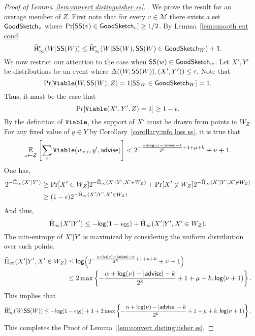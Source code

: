 \begin{proof}[Proof of Lemma~\ref{lem:convert distinguisher ss}].
We prove the result for an average member of $Z$.  First note that for every $v\in \mathcal{M}$ there exists a set $\mathsf{GoodSketch}_v$ where $\Pr[{\mathsf{SS}}(v)\in \mathsf{GoodSketch}_v] \ge 1/2$.  By Lemma~\ref{lem:smooth ent cond}
\[
\tilde{\mathrm{H}}_\infty^\epsilon(W| {\mathsf{SS}}(W)) \le \tilde{\mathrm{H}}_\infty^\epsilon(W| {\mathsf{SS}}(W), {\mathsf{SS}}(W)\in \mathsf{GoodSketch}_W) +1.
\]
We now restrict our attention to the case when ${\mathsf{SS}}(w) \in \mathsf{GoodSketch}_w$.   
Let $X', Y'$ be distributions  be an event where $\Delta((W, {\mathsf{SS}}(W)), (X', Y'))\le \epsilon$. Note that 
\[
\Pr[\mathtt{Viable}(W, {\mathsf{SS}}(W), Z) = 1| {\mathsf{SS}}_W \in \mathsf{GoodSketch}_W] = 1.
\]
Thus, it must be the case that 
\[
\Pr[\mathtt{Viable}(X', Y', Z) = 1] \ge 1-\epsilon.
\]
By the definition of $\mathtt{Viable}$, the support of $X'$ must be drawn from points in $W_Z$.  For any fixed value of $y\in Y$ by Corollary~\ref{corollary:info loss ss}, it is true that 
\begin{align*}
\operatorname*{\mathbb{E}}_{z\leftarrow Z} \left[\sum_{i }  \mathtt{Viable}(w_{z,i}, y', {\mathsf{advise}})  \right]< 2^{-\frac{\alpha+\mathsf{log}\!\left(\nu\right)-|{\mathsf{advise}}|-k}{2^k}+1+\mu+k}+\nu+1.
\end{align*}
One has, 
\begin{align*}
2^{-\tilde{\mathrm{H}}_\infty(X'|Y')} &\ge  \Pr[X' \in W_Z] 2^{-\tilde{\mathrm{H}}_\infty(X'|Y', X'\in W_Z) }+ \Pr[X'\not\in W_Z] 2^{-\tilde{\mathrm{H}}_\infty(X'|Y', X'\not\in W_Z)}\\
 &\ge  (1-\epsilon)2^{-\tilde{\mathrm{H}}_\infty(X'|Y', X'\in W_Z) }
\end{align*}
And thus, 
\[
\tilde{\mathrm{H}}_\infty(X'|Y') \le  -\mathsf{log}\!\left(1-\epsilon_{\mathsf{SS}}\right) +\tilde{\mathrm{H}}_\infty(X'|Y', X'\in W_Z).
\]
The min-entropy of $X' |Y'$ is maximized by considering the uniform distribution over such points. \begin{align*}
\tilde{\mathrm{H}}_\infty(X'|Y' , X'\in W_Z) &\le \mathsf{log}\!\left(2^{-\frac{\alpha+\mathsf{log}\!\left(\nu\right)-|{\mathsf{advise}}|-k}{2^k}+1+\mu+k}+\nu+1\right)\\
&\le 2\max\left\{-\frac{\alpha+\mathsf{log}\!\left(\nu\right)-|{\mathsf{advise}}|-k}{2^k}+1+\mu+k, \mathsf{log}\!\left(\nu+1\right)\right\}.
\end{align*}
This implies that 
\[
\tilde{\mathrm{H}}_\infty^\epsilon(W| {\mathsf{SS}}(W)) \le -\mathsf{log}\!\left(1-\epsilon_{\mathsf{SS}}\right) +1 + 2\max\left\{-\frac{\alpha+\mathsf{log}\!\left(\nu\right)-|{\mathsf{advise}}|-k}{2^k}+1+\mu+k, \mathsf{log}\!\left(\nu+1\right)\right\}.
\]
This completes the Proof of Lemma~\ref{lem:convert distinguisher ss}.
\end{proof}

